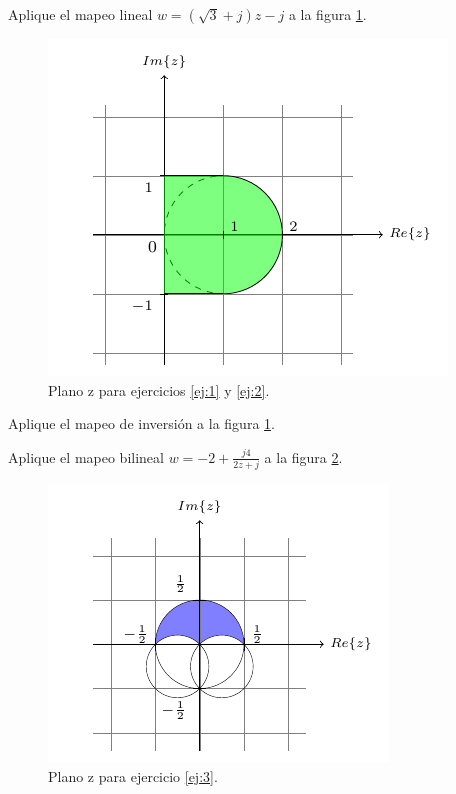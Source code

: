 \begin{ejercicio}
    Aplique el mapeo lineal $w = (\sqrt{3}+j)z-j$ a la figura \ref{fig:map1}.
    \label{ej:1}
\end{ejercicio}

\begin{figure}[!h]
    \centering
    \includegraphics[width=.5\linewidth]{figs/map1.pdf}
    \caption{Plano z para ejercicios \ref{ej:1} y \ref{ej:2}.}
    \label{fig:map1}
\end{figure}

\begin{ejercicio}
    Aplique el mapeo de inversión a la figura \ref{fig:map1}.
    \label{ej:2}
\end{ejercicio}

\begin{ejercicio}
    Aplique el mapeo bilineal $w = -2 + \frac{j4}{2z+j}$ a la figura \ref{fig:map2}.
    \label{ej:3}
\end{ejercicio}

\begin{figure}[!h]
    \centering
    \includegraphics[width=.6\linewidth]{figs/map2.pdf}
    \caption{Plano z para ejercicio \ref{ej:3}.}
    \label{fig:map2}
\end{figure}

